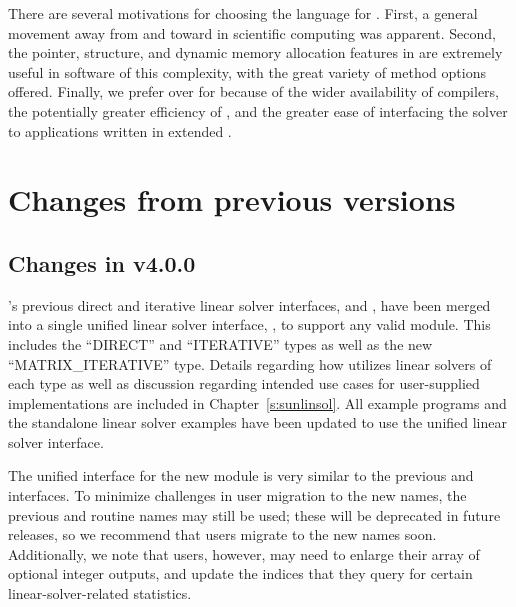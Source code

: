 There are several motivations for choosing the {\CC} language for {\ida}.
First, a general movement away from {\F} and toward {\CC} in scientific
computing was apparent.  Second, the pointer, structure, and dynamic
memory allocation features in {\CC} are extremely useful in software of
this complexity, with the great variety of method options offered.
Finally, we prefer {\CC} over {\CPP} for {\ida} because of the wider
availability of {\CC} compilers, the potentially greater efficiency of {\CC},
and the greater ease of interfacing the solver to applications written
in extended {\F}.


\section{Changes from previous versions}

\subsection*{Changes in v4.0.0}

{\ida}'s previous direct and iterative linear solver interfaces,
{\idadls} and {\idaspils}, have been merged into a single unified linear
solver interface, {\idals}, to support any valid {\sunlinsol} module.
This includes the ``DIRECT'' and ``ITERATIVE'' types as well as the new
``MATRIX\_ITERATIVE'' type. Details regarding how {\idals} utilizes linear
solvers of each type as well as discussion regarding intended use cases for
user-supplied {\sunlinsol} implementations are included in
Chapter~\ref{s:sunlinsol}. All {\ida} example programs and the standalone
linear solver examples have been updated to use the unified linear solver
interface.

The unified interface for the new {\idals} module is very similar to the
previous {\idadls} and {\idaspils} interfaces. To minimize challenges in user
migration to the new names, the previous {\CC} and {\F} routine names may still
be used; these will be deprecated in future releases, so we recommend that users
migrate to the new names soon. Additionally, we note that {\F} users, however,
may need to enlarge their  array of optional integer outputs, and
update the indices that they query for certain linear-solver-related
statistics.

